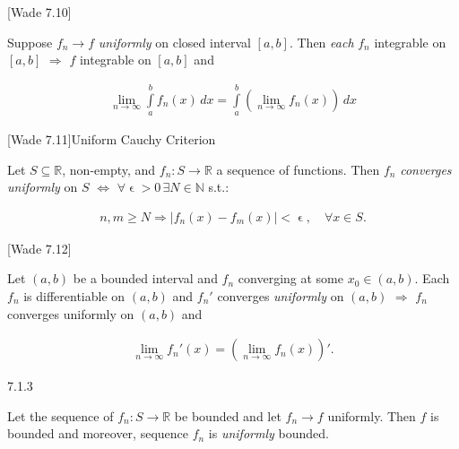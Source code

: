 \documentclass[10pt]{article} %
\newcommand{\cw}[1]{[Wade #1]}
\renewcommand{\geq}{\geqslant}
\begin{document}
\begin{multicols}{3}
\begin{theorem}{\cw{7.10}}{}

    Suppose $f_n \to f$ \emph{uniformly} on closed interval $[a,b]$. Then \emph{each} $f_n$ integrable on $[a,b]$ $\Rightarrow$ $f$ integrable on $[a,b]$ and

        \begin{align*}
            \lim_{n \to \infty} \int\limits_a^b f_n(x) \, dx = \int\limits_a^b \left( \lim_{n \to \infty} f_n(x) \right) \, dx
        \end{align*}

\end{theorem}

\begin{lemma}{\cw{7.11}}{Uniform Cauchy Criterion}

    Let $S \subseteq \mathbb{R}$, non-empty, and $f_n: S \to \mathbb{R}$ a sequence of functions. Then $f_n$ \emph{converges uniformly} on $S$ $\Leftrightarrow$ $\forall \upvarepsilon > 0 \, \exists N \in \mathbb{N}$ s.t.:

        \begin{align*}
            n,m \geq N \Rightarrow |f_n(x) - f_m(x)| < \upvarepsilon, \quad \forall x \in S.
        \end{align*}

\end{lemma}

\begin{theorem}{\cw{7.12}}{}

    Let $(a,b)$ be a bounded interval and $f_n$ converging at some $x_0 \in (a,b)$. Each $f_n$ is differentiable on $(a,b)$ and $f_n'$ converges \emph{uniformly} on $(a,b)$ $\Rightarrow$ $f_n$ converges uniformly on $(a,b)$ and

        \begin{align*}
            \lim_{n \to \infty} f_n'(x) = \left( \lim_{n \to \infty} f_n(x) \right)'.
        \end{align*}

\end{theorem}

\begin{exercise}{7.1.3}{}

    Let the sequence of $f_n: S \to \mathbb{R}$ be bounded and let $f_n \to f$ uniformly. Then $f$ is bounded and moreover, sequence $f_n$ is \emph{uniformly} bounded.


\end{exercise}
\end{multicols}
\end{document}
